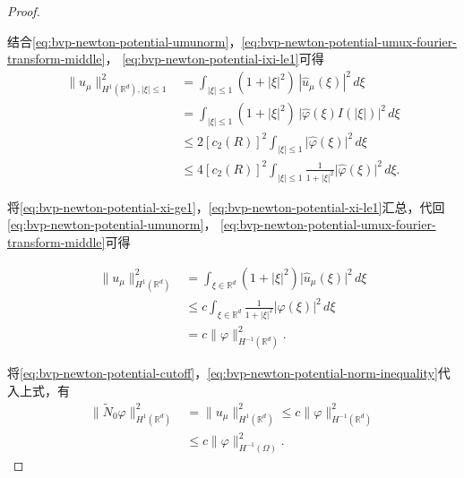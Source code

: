 \begin{proof}
\begin{enumerate}
结合\eqref{eq:bvp-newton-potential-umunorm}，\eqref{eq:bvp-newton-potential-umux-fourier-transform-middle}，  \eqref{eq:bvp-newton-potential-ixi-le1}可得
\begin{equation}
  \label{eq:bvp-newton-potential-xi-le1}
  \begin{split}
    \big\| u_{\mu} \big\|_{H^{1}(\mathbb{R}^d), |\xi| \le 1}^2 &= \int_{|\xi| \le 1}
    \left( 1+ |\xi|^2 \right) \, |\widehat{u}_{\mu} (\xi) |^2 \, d \xi \\
    & =
    \int_{|\xi| \le 1} \left(1+ |\xi|^2 \right) \, \big|\widehat{\varphi}(\xi) I(|\xi|) \big|^2 \, d \xi \\
    & \le 2 \left[ c_{2}(R) \right]^2
    \int_{|\xi| \le 1} \big| \widehat{\varphi}(\xi) \big|^2 \, d \xi \\
    & \le 4 \left[ c_{2}(R) \right]^2
    \int_{|\xi| \le 1}
    \frac{1}{1+ | \xi |^2}
    \big| \widehat{\varphi}(\xi) \big|^2 \, d \xi.
  \end{split}
\end{equation}
\end{enumerate}

将\eqref{eq:bvp-newton-potential-xi-ge1}，\eqref{eq:bvp-newton-potential-xi-le1}汇总，代回\eqref{eq:bvp-newton-potential-umunorm}， \eqref{eq:bvp-newton-potential-umux-fourier-transform-middle}可得

\begin{equation}
  \label{eq:bvp-newton-potential-xi-sum}
  \begin{split}
    \big\| u _{\mu} \big\|_{H^{1}(\mathbb{R}^d)}^{2} &=
    \int_{\xi \in \mathbb{R}^d}
    \left( 1 + |\xi|^2 \right)
    \big| \widehat{u}_{\mu} (\xi) \big|^2
    \, d \xi \\
    & \le c \int_{\xi \in \mathbb{R}^d}
    \frac{1}{1 + | \xi |^2}
    \big| \widehat{\varphi}(\xi) \big|^2 \, d \xi \\
    & = c \big\| \varphi \big\|_{H^{-1}(\mathbb{R}^d)}^2.
  \end{split}
\end{equation}

将\eqref{eq:bvp-newton-potential-cutoff}，\eqref{eq:bvp-newton-potential-norm-inequality}代入上式，有
\begin{equation}
  \label{eq:bvp-newton-potential-n0varphi-cvarphi-ineq}
  \begin{split}
    \big\| \widetilde{N}_{0} \varphi \big\|_{H^{1}(\mathbb{R}^d)}^{2} &=
    \big\| u _{\mu} \big\|_{H^{1}(\mathbb{R}^d)}^{2}
    \le c \big\| \varphi \big\|_{H^{-1}(\mathbb{R}^d)}^2 \\
    & \le c \big\| \varphi \big\|_{H^{-1}(\Omega)}^2.
  \end{split}
\end{equation}














\end{proof}
